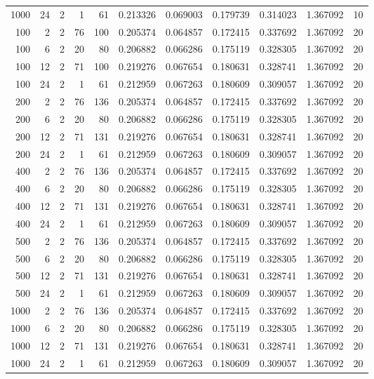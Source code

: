 \begin{table}
\begin{tabular}{rrrrrrrrrrr}
1000 & 24 & 2 & 1 & 61 & 0.213326 & 0.069003 & 0.179739 & 0.314023 & 1.367092 & 10 \\
100 & 2 & 2 & 76 & 100 & 0.205374 & 0.064857 & 0.172415 & 0.337692 & 1.367092 & 20 \\
100 & 6 & 2 & 20 & 80 & 0.206882 & 0.066286 & 0.175119 & 0.328305 & 1.367092 & 20 \\
100 & 12 & 2 & 71 & 100 & 0.219276 & 0.067654 & 0.180631 & 0.328741 & 1.367092 & 20 \\
100 & 24 & 2 & 1 & 61 & 0.212959 & 0.067263 & 0.180609 & 0.309057 & 1.367092 & 20 \\
200 & 2 & 2 & 76 & 136 & 0.205374 & 0.064857 & 0.172415 & 0.337692 & 1.367092 & 20 \\
200 & 6 & 2 & 20 & 80 & 0.206882 & 0.066286 & 0.175119 & 0.328305 & 1.367092 & 20 \\
200 & 12 & 2 & 71 & 131 & 0.219276 & 0.067654 & 0.180631 & 0.328741 & 1.367092 & 20 \\
200 & 24 & 2 & 1 & 61 & 0.212959 & 0.067263 & 0.180609 & 0.309057 & 1.367092 & 20 \\
400 & 2 & 2 & 76 & 136 & 0.205374 & 0.064857 & 0.172415 & 0.337692 & 1.367092 & 20 \\
400 & 6 & 2 & 20 & 80 & 0.206882 & 0.066286 & 0.175119 & 0.328305 & 1.367092 & 20 \\
400 & 12 & 2 & 71 & 131 & 0.219276 & 0.067654 & 0.180631 & 0.328741 & 1.367092 & 20 \\
400 & 24 & 2 & 1 & 61 & 0.212959 & 0.067263 & 0.180609 & 0.309057 & 1.367092 & 20 \\
500 & 2 & 2 & 76 & 136 & 0.205374 & 0.064857 & 0.172415 & 0.337692 & 1.367092 & 20 \\
500 & 6 & 2 & 20 & 80 & 0.206882 & 0.066286 & 0.175119 & 0.328305 & 1.367092 & 20 \\
500 & 12 & 2 & 71 & 131 & 0.219276 & 0.067654 & 0.180631 & 0.328741 & 1.367092 & 20 \\
500 & 24 & 2 & 1 & 61 & 0.212959 & 0.067263 & 0.180609 & 0.309057 & 1.367092 & 20 \\
1000 & 2 & 2 & 76 & 136 & 0.205374 & 0.064857 & 0.172415 & 0.337692 & 1.367092 & 20 \\
1000 & 6 & 2 & 20 & 80 & 0.206882 & 0.066286 & 0.175119 & 0.328305 & 1.367092 & 20 \\
1000 & 12 & 2 & 71 & 131 & 0.219276 & 0.067654 & 0.180631 & 0.328741 & 1.367092 & 20 \\
1000 & 24 & 2 & 1 & 61 & 0.212959 & 0.067263 & 0.180609 & 0.309057 & 1.367092 & 20 \\

\end{tabular}
\end{table}
